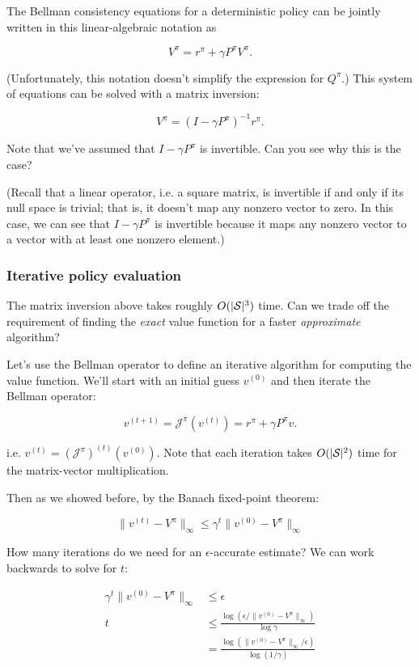 \documentclass[../main/main]{subfiles}
\begin{document}
The Bellman consistency equations for a deterministic policy can be jointly written in this linear-algebraic notation as

\[
    V^\pi = r^\pi + \gamma P^\pi V^\pi.
\]

(Unfortunately, this notation doesn't simplify the expression for $Q^\pi$.) This system of equations can be solved with a matrix inversion:

\[
    V^\pi = (I - \gamma P^\pi)^{-1} r^\pi.
\]

Note that we've assumed that $I - \gamma P^\pi$ is invertible. Can you see why this is the case?

(Recall that a linear operator, i.e. a square matrix, is invertible if and only if its null space is trivial; that is, it doesn't map any nonzero vector to zero. In this case, we can see that $I - \gamma P^\pi$ is invertible because it maps any nonzero vector to a vector with at least one nonzero element.)



\subsubsection{Iterative policy evaluation}

The matrix inversion above takes roughly $O(|\S|^3)$ time. Can we trade off the requirement of finding the \emph{exact} value function for a faster \emph{approximate} algorithm?

Let's use the Bellman operator to define an iterative algorithm for computing the value function. We'll start with an initial guess $v^{(0)}$ and then iterate the Bellman operator:

\[
    v^{(t+1)} = \mathcal{J}^{\pi}(v^{(t)}) = r^{\pi} + \gamma P^{\pi} v.
\]

i.e. $v^{(t)} = (\mathcal{J}^{\pi})^{(t)} (v^{(0)})$. Note that each iteration takes $O(|\S|^2)$ time for the matrix-vector multiplication.

Then as we showed before, by the Banach fixed-point theorem:


\[ \|v^{(t)} - V^\pi \|_{\infty} \le \gamma^{t} \| v^{(0)} - V^\pi\|_{\infty} \]


How many iterations do we need for an $\epsilon$-accurate estimate? We can work backwards to solve for $t$:

\begin{align*}
    \gamma^t \|v^{(0)} - V^\pi\|_{\infty} &\le \epsilon \\
    t &\le \frac{\log (\epsilon / \|v^{(0)} - V^\pi\|_{\infty})}{\log \gamma} \\
    &= \frac{\log (\|v^{(0)} - V^\pi\|_{\infty} / \epsilon)}{\log (1 / \gamma)} \\
\end{align*}
\end{document}
